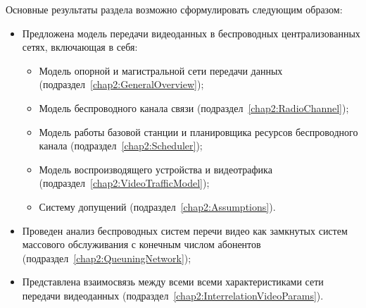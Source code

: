 Основные результаты раздела возможно сформулировать следующим образом:
\begin{itemize}
	\item Предложена модель передачи видеоданных в беспроводных централизованных сетях, включающая в себя:
	\begin{itemize}
		\item Модель опорной и магистральной сети передачи данных (подраздел~\ref{chap2:GeneralOverview});
		\item Модель беспроводного канала связи (подраздел~\ref{chap2:RadioChannel});
		\item Модель работы базовой станции и планировщика ресурсов беспроводного канала (подраздел~\ref{chap2:Scheduler});
		\item Модель воспроизводящего устройства и видеотрафика (подраздел~\ref{chap2:VideoTrafficModel});
		\item Систему допущений (подраздел~\ref{chap2:Assumptions}).
	\end{itemize}
	\item Проведен анализ беспроводных систем перечи видео как замкнутых систем массового обслуживания с конечным числом абонентов (подраздел~\ref{chap2:QueuningNetwork});
	\item Представлена взаимосвязь между всеми всеми характеристиками сети передачи видеоданных (подраздел~\ref{chap2:InterrelationVideoParams}).
\end{itemize}